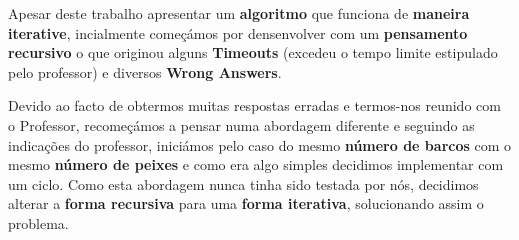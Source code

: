 \documentclass[11pt]{article}
\begin{document}
\hspace{0,5cm} Apesar deste trabalho apresentar um \textbf{algoritmo} que funciona de \textbf{maneira iterative}, incialmente
começámos por densenvolver com um \textbf{pensamento recursivo} o que originou alguns \textbf{Timeouts} (excedeu
o tempo limite estipulado pelo professor) e diversos \textbf{Wrong Answers}. 

Devido ao facto de obtermos muitas
respostas erradas e termos-nos reunido com o Professor, recomeçámos a pensar numa abordagem diferente e seguindo
as indicações do professor, iniciámos pelo caso do mesmo \textbf{número de barcos} com o mesmo \textbf{número
de peixes} e como era algo simples decidimos implementar com um ciclo. Como esta abordagem nunca tinha sido
testada por nós, decidimos alterar a \textbf{forma recursiva} para uma \textbf{forma iterativa}, solucionando
assim o problema.
\end{document}
